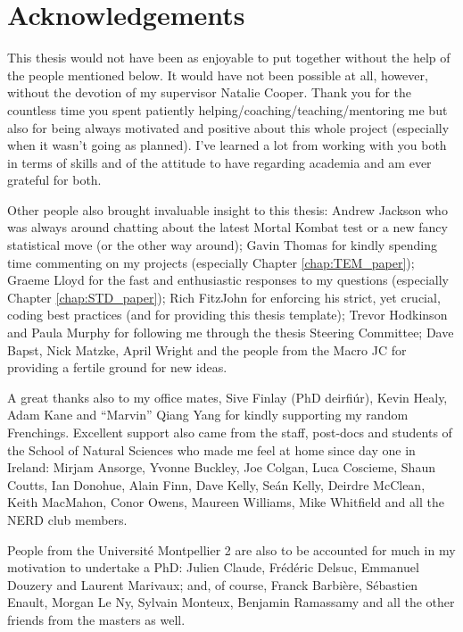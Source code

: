 \chapter*{Acknowledgements}

This thesis would not have been as enjoyable to put together without the help of the people mentioned below.
It would have not been possible at all, however, without the devotion of my supervisor Natalie Cooper.
Thank you for the countless time you spent patiently helping/coaching/teaching/mentoring me but also for being always motivated and positive about this whole project (especially when it wasn't going as planned).
I've learned a lot from working with you both in terms of skills and of the attitude to have regarding academia and am ever grateful for both.

Other people also brought invaluable insight to this thesis:
Andrew Jackson who was always around chatting about the latest Mortal Kombat test or a new fancy statistical move (or the other way around);
Gavin Thomas for kindly spending time commenting on my projects (especially Chapter \ref{chap:TEM_paper});
Graeme Lloyd for the fast and enthusiastic responses to my questions (especially Chapter \ref{chap:STD_paper});
Rich FitzJohn for enforcing his strict, yet crucial, coding best practices (and for providing this thesis template);
Trevor Hodkinson and Paula Murphy for following me through the thesis Steering Committee;
Dave Bapst, Nick Matzke, April Wright and the people from the Macro JC for providing a fertile ground for new ideas.

A great thanks also to my office mates, Sive Finlay (PhD deirfi\'{u}r), Kevin Healy, Adam Kane and ``Marvin'' Qiang Yang for kindly supporting my random Frenchings.
Excellent support also came from the staff, post-docs and students of the School of Natural Sciences who made me feel at home since day one in Ireland:
Mirjam Ansorge, Yvonne Buckley, Joe Colgan, Luca Coscieme, Shaun Coutts, Ian Donohue, Alain Finn, Dave Kelly, Se\'{a}n Kelly, Deirdre McClean, Keith MacMahon, Conor Owens, Maureen Williams, Mike Whitfield and all the NERD club members.

People from the Universit\'{e} Montpellier 2 are also to be accounted for much in my motivation to undertake a PhD:%
Julien Claude, Fr\'{e}d\'{e}ric Delsuc, Emmanuel Douzery and Laurent Marivaux;
and, of course, Franck Barbi\`{e}re, S\'{e}bastien Enault, Morgan Le Ny, Sylvain Monteux, Benjamin Ramassamy and all the other friends from the masters as well.

